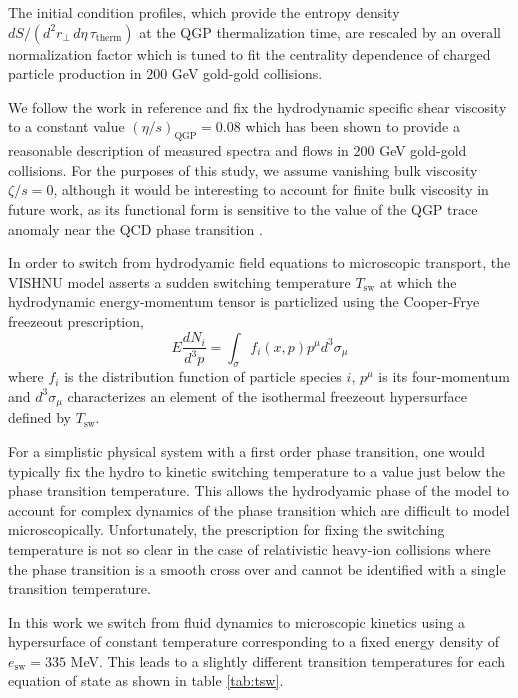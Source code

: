 \documentclass[aps,prc,reprint,amsmath,nofootinbib,superscriptaddress]{revtex4-1}
\begin{document}
The initial condition profiles, which provide the entropy density $dS/(d^2r_\perp\, d\eta\, \tau_\text{therm})$ at the QGP thermalization time, are rescaled by an 
overall normalization factor which is tuned to fit the centrality dependence of charged particle production in $200$ GeV gold-gold collisions.

We follow the work in reference \cite{?} and fix the hydrodynamic specific shear viscosity to a constant value $(\eta/s)_\text{QGP}=0.08$ which has been shown to 
provide a reasonable description of measured spectra and flows in $200$ GeV gold-gold collisions. For the purposes of this study, we assume vanishing bulk viscosity 
$\zeta/s=0$, although it would be interesting to account for finite bulk viscosity in future 
work, as its functional form is sensitive to the value of the QGP trace anomaly near the QCD phase transition \cite{?}.

In order to switch from hydrodyamic field equations to microscopic transport, the VISHNU model asserts a sudden switching temperature $T_\text{sw}$ at which the 
hydrodynamic energy-momentum tensor is particlized using the Cooper-Frye freezeout prescription,
\begin{equation}
 E\frac{dN_i}{d^3p} = \int_\sigma f_i(x,p) p^\mu d^3\sigma_\mu
 \label{cooper-frye}
\end{equation}
where $f_i$ is the distribution function of particle species $i$, $p^\mu$ is its four-momentum and $d^3\sigma_\mu$ characterizes an element of the isothermal freezeout 
hypersurface defined by $T_\text{sw}$.

For a simplistic physical system with a first order phase transition, one would typically fix the hydro to kinetic switching temperature to a value just below the 
phase transition temperature. This allows the hydrodyamic phase of the model to account for complex dynamics of the phase transition which are difficult to model 
microscopically. Unfortunately, the prescription for fixing the switching temperature is not so clear in the case of relativistic heavy-ion collisions where the phase 
transition is a smooth cross over and cannot be identified with a single transition temperature. 

In this work we switch from fluid dynamics to microscopic kinetics using a hypersurface of constant temperature corresponding to a fixed energy density of $e_\text{sw}= 335$ MeV. 
This leads to a slightly different transition temperatures for each equation of state as shown in table \ref{tab:tsw}.
\end{document}
